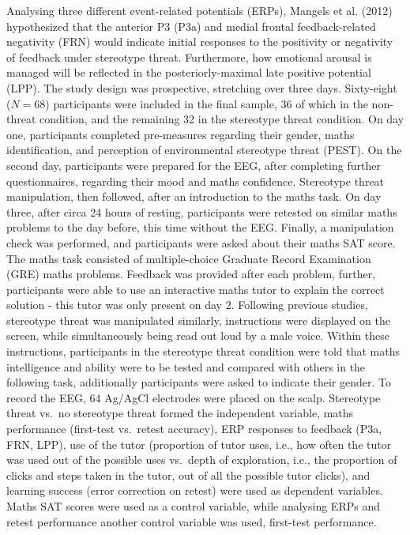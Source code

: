 \documentclass[
  stu,floatsintext]{apa7}
\begin{document}
Analysing three different event-related potentials (ERPs), Mangels et al. (2012) hypothesized that the anterior P3 (P3a) and medial frontal feedback-related negativity (FRN) would indicate initial responses to the positivity or negativity of feedback under stereotype threat.
Furthermore, how emotional arousal is managed will be reflected in the posteriorly-maximal late positive potential (LPP).
The study design was prospective, stretching over three days.
Sixty-eight (\(N = 68\)) participants were included in the final sample, 36 of which in the non-threat condition, and the remaining 32 in the stereotype threat condition.
On day one, participants completed pre-measures regarding their gender, maths identification, and perception of environmental stereotype threat (PEST).
On the second day, participants were prepared for the EEG, after completing further questionnaires, regarding their mood and maths confidence.
Stereotype threat manipulation, then followed, after an introduction to the maths task.
On day three, after circa 24 hours of resting, participants were retested on similar maths problems to the day before, this time without the EEG.
Finally, a manipulation check was performed, and participants were asked about their maths SAT score.
The maths task consisted of multiple-choice Graduate Record Examination (GRE) maths problems.
Feedback was provided after each problem, further, participants were able to use an interactive maths tutor to explain the correct solution - this tutor was only present on day 2.
Following previous studies, stereotype threat was manipulated similarly, instructions were displayed on the screen, while simultaneously being read out loud by a male voice.
Within these instructions, participants in the stereotype threat condition were told that maths intelligence and ability were to be tested and compared with others in the following task, additionally participants were asked to indicate their gender.
To record the EEG, 64 Ag/AgCl electrodes were placed on the scalp.
Stereotype threat vs.~no stereotype threat formed the independent variable, maths performance (first-test vs.~retest accuracy), ERP responses to feedback (P3a, FRN, LPP), use of the tutor (proportion of tutor uses, i.e., how often the tutor was used out of the possible uses vs.~depth of exploration, i.e., the proportion of clicks and steps taken in the tutor, out of all the possible tutor clicks), and learning success (error correction on retest) were used as dependent variables.
Maths SAT scores were used as a control variable, while analysing ERPs and retest performance another control variable was used, first-test performance.\\
\end{document}
